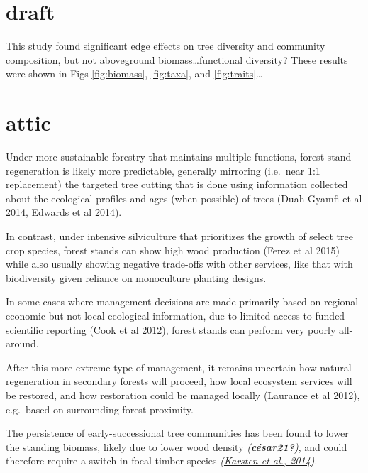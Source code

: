 \documentclass[
  12pt,
]{article}
\begin{document}
\hypertarget{draft}{%
\section*{draft}\label{draft}}

This study found significant edge effects on tree diversity and community composition, but not aboveground biomass\ldots functional diversity?
These results were shown in Figs \ref{fig:biomass}, \ref{fig:taxa}, and \ref{fig:traits}\ldots{}

\hypertarget{attic}{%
\section*{attic}\label{attic}}

Under more sustainable forestry that maintains multiple functions, forest stand regeneration is likely more predictable, generally mirroring (i.e.~near 1:1 replacement) the targeted tree cutting that is done using information collected about the ecological profiles and ages (when possible) of trees (Duah-Gyamfi et al 2014, Edwards et al 2014).

In contrast, under intensive silviculture that prioritizes the growth of select tree crop species, forest stands can show high wood production (Ferez et al 2015) while also usually showing negative trade-offs with other services, like that with biodiversity given reliance on monoculture planting designs.

In some cases where management decisions are made primarily based on regional economic but not local ecological information, due to limited access to funded scientific reporting (Cook et al 2012), forest stands can perform very poorly all-around.

After this more extreme type of management, it remains uncertain how natural regeneration in secondary forests will proceed, how local ecosystem services will be restored, and how restoration could be managed locally (Laurance et al 2012), e.g.~based on surrounding forest proximity.

The persistence of early-successional tree communities has been found to lower the standing biomass, likely due to lower wood density \emph{(\protect\hyperlink{ref-cuxe9sar21}{\textbf{césar21?}})}, and could therefore require a switch in focal timber species \emph{(\protect\hyperlink{ref-karsten14}{Karsten et al., 2014})}.

\newpage
\end{document}
